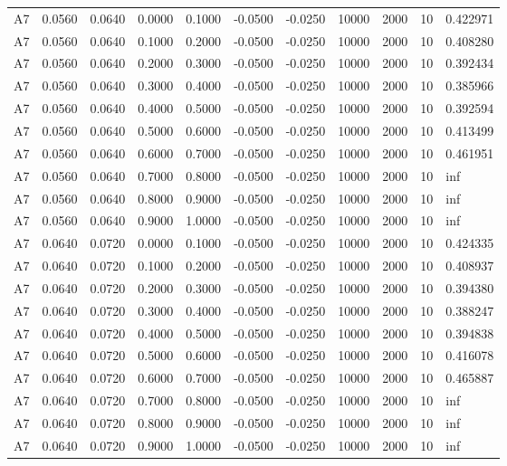 \documentclass{article}
\begin{document}
\begin{longtable}{l r r r r r r r r r l}
A7 & 0.0560 & 0.0640 & 0.0000 & 0.1000 & -0.0500 & -0.0250 & 10000 & 2000 & 10 & 0.422971 \\
A7 & 0.0560 & 0.0640 & 0.1000 & 0.2000 & -0.0500 & -0.0250 & 10000 & 2000 & 10 & 0.408280 \\
A7 & 0.0560 & 0.0640 & 0.2000 & 0.3000 & -0.0500 & -0.0250 & 10000 & 2000 & 10 & 0.392434 \\
A7 & 0.0560 & 0.0640 & 0.3000 & 0.4000 & -0.0500 & -0.0250 & 10000 & 2000 & 10 & 0.385966 \\
A7 & 0.0560 & 0.0640 & 0.4000 & 0.5000 & -0.0500 & -0.0250 & 10000 & 2000 & 10 & 0.392594 \\
A7 & 0.0560 & 0.0640 & 0.5000 & 0.6000 & -0.0500 & -0.0250 & 10000 & 2000 & 10 & 0.413499 \\
A7 & 0.0560 & 0.0640 & 0.6000 & 0.7000 & -0.0500 & -0.0250 & 10000 & 2000 & 10 & 0.461951 \\
A7 & 0.0560 & 0.0640 & 0.7000 & 0.8000 & -0.0500 & -0.0250 & 10000 & 2000 & 10 & inf \\
A7 & 0.0560 & 0.0640 & 0.8000 & 0.9000 & -0.0500 & -0.0250 & 10000 & 2000 & 10 & inf \\
A7 & 0.0560 & 0.0640 & 0.9000 & 1.0000 & -0.0500 & -0.0250 & 10000 & 2000 & 10 & inf \\
A7 & 0.0640 & 0.0720 & 0.0000 & 0.1000 & -0.0500 & -0.0250 & 10000 & 2000 & 10 & 0.424335 \\
A7 & 0.0640 & 0.0720 & 0.1000 & 0.2000 & -0.0500 & -0.0250 & 10000 & 2000 & 10 & 0.408937 \\
A7 & 0.0640 & 0.0720 & 0.2000 & 0.3000 & -0.0500 & -0.0250 & 10000 & 2000 & 10 & 0.394380 \\
A7 & 0.0640 & 0.0720 & 0.3000 & 0.4000 & -0.0500 & -0.0250 & 10000 & 2000 & 10 & 0.388247 \\
A7 & 0.0640 & 0.0720 & 0.4000 & 0.5000 & -0.0500 & -0.0250 & 10000 & 2000 & 10 & 0.394838 \\
A7 & 0.0640 & 0.0720 & 0.5000 & 0.6000 & -0.0500 & -0.0250 & 10000 & 2000 & 10 & 0.416078 \\
A7 & 0.0640 & 0.0720 & 0.6000 & 0.7000 & -0.0500 & -0.0250 & 10000 & 2000 & 10 & 0.465887 \\
A7 & 0.0640 & 0.0720 & 0.7000 & 0.8000 & -0.0500 & -0.0250 & 10000 & 2000 & 10 & inf \\
A7 & 0.0640 & 0.0720 & 0.8000 & 0.9000 & -0.0500 & -0.0250 & 10000 & 2000 & 10 & inf \\
A7 & 0.0640 & 0.0720 & 0.9000 & 1.0000 & -0.0500 & -0.0250 & 10000 & 2000 & 10 & inf \\

\end{longtable}
\end{document}
